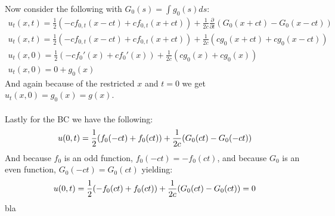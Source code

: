 \documentclass{article}
\begin{document}
Now consider the following with $G_0(s) = \int g_0(s)ds$:
\begin{equation}
\begin{aligned}
u_t(x, t) = \frac{1}{2}(-cf_{0,t}(x-ct) + cf_{0,t}(x+ct)) + \frac{1}{2c} \frac{\partial}{\partial t}(G_0(x+ct) - G_0(x - ct))\\
u_t(x, t) = \frac{1}{2}(-cf_{0,t}(x-ct) + cf_{0,t}(x+ct)) + \frac{1}{2c}(cg_0(x+ct) + cg_0(x - ct))\\
u_t(x, 0) = \frac{1}{2}(-cf_0'(x) + cf_0'(x)) + \frac{1}{2c}(cg_0(x) + cg_0(x))\\
u_t(x,0) = 0 + g_0(x)
\end{aligned}
\end{equation}
And again because of the restricted $x$ and $t = 0$ we get $u_t(x,0) = g_0(x) = g(x)$.\\
\\
Lastly for the BC we have the following:
\begin{equation}
u(0, t) = \frac{1}{2}(f_0(-ct) + f_0(ct)) + \frac{1}{2c}(G_0(ct) - G_0(-ct))\\
\end{equation}
And because $f_0$ is an odd function, $f_0(-ct) = -f_0(ct)$, and because $G_0$ is an even function, $G_0(-ct) = G_0(ct)$ yielding:
\begin{equation}
u(0, t) = \frac{1}{2}(-f_0(ct) + f_0(ct)) + \frac{1}{2c}(G_0(ct) - G_0(ct))= 0\\
\end{equation}
bla
\end{document}
